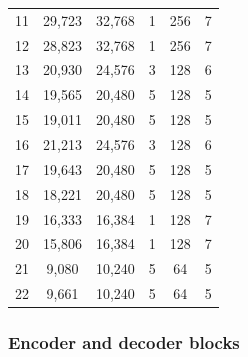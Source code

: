 \documentclass{article}
\begin{document}
\begin{table}[t]
\begin{tabular}{lccccc}
11 & 29,723 & 32,768 & 1 & 256 & 7 \\ %
12 & 28,823 & 32,768 & 1 & 256 & 7 \\ %
13 & 20,930 & 24,576 & 3 & 128 & 6 \\ %
14 & 19,565 & 20,480 & 5 & 128 & 5 \\ %
15 & 19,011 & 20,480 & 5 & 128 & 5 \\ %
16 & 21,213 & 24,576 & 3 & 128 & 6 \\ %
17 & 19,643 & 20,480 & 5 & 128 & 5 \\ %
18 & 18,221 & 20,480 & 5 & 128 & 5 \\ %
19 & 16,333 & 16,384 & 1 & 128 & 7 \\ %
20 & 15,806 & 16,384 & 1 & 128 & 7 \\ %
21 & 9,080 & 10,240 & 5 & 64 & 5 \\ %
22 & 9,661 & 10,240 & 5 & 64 & 5 \\ %
\bottomrule
\end{tabular}
\end{table}

\subsubsection{Encoder and decoder blocks}
\end{document}
